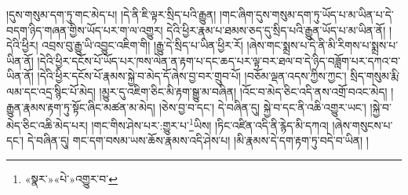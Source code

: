 །དུས་གསུམ་དག་ཏུ་གང་མེད་པ། །དེ་ནི་ཇི་ལྟར་སྲིད་པའི་རྒྱུན། །གང་ཞིག་དུས་གསུམ་དག་ཏུ་ཡོད་པ་མ་ཡིན་པ་དེ་བདག་ཉིད་གཞན་གྱིས་ཡོད་པར་ག་ལ་འགྱུར། དེའི་ཕྱིར་རྣམ་པ་ཐམས་ཅད་དུ་སྲིད་པའི་རྒྱུན་ཡོད་པ་མ་ཡིན་ནོ། །དེའི་ཕྱིར། འབྲས་བུ་རྒྱུ་ཡི་འབྱུང་འཇིག་གི། །རྒྱུ་དེ་སྲིད་པ་ཡིན་ཕྱིར་རོ། །ཞེས་གང་སྨྲས་པ་དེ་ནི་མི་རིགས་པ་སྨྲས་པ་ཡིན་ནོ། །དེའི་ཕྱིར་དངོས་པོ་ཡོད་པར་ཁས་ལེན་ན་རྟག་པ་དང་ཆད་པར་ལྟ་བར་ཐལ་བ་དེ་ཉིད་བཟློག་པར་དཀའ་བ་ཡིན་ནོ། །དེའི་ཕྱིར་དངོས་པོ་རྣམས་སྐྱེ་བ་མེད་དོ་ཞེས་བྱ་བར་གྲུབ་པོ། །བཅོམ་ལྡན་འདས་ཀྱིས་ཀྱང་། སྲིད་གསུམ་རྨི་ལམ་དང་འདྲ་སྙིང་པོ་མེད། །མྱུར་དུ་འཇིག་ཅིང་མི་རྟག་སྒྱུ་མ་བཞིན། །འོང་བ་མེད་ཅིང་འདི་ནས་འགྲོ་བའང་མེད། །རྒྱུན་རྣམས་རྟག་ཏུ་སྟོང་ཞིང་མཚན་མ་མེད། །ཅེས་བྱ་བ་དང་། དེ་བཞིན་དུ། སྐྱེ་བ་དང་ནི་འཆི་འགྱུར་ཡང་། །སྐྱེ་བ་མེད་ཅིང་འཆི་མེད་པར། །གང་གིས་ཤེས་པར་:གྱུར་པ་\footnote{«སྣར་»«པེ་»འགྱུར་བ་}ཡིས། །ཏིང་འཛིན་འདི་ནི་རྙེད་མི་དཀའ། །ཞེས་གསུངས་པ་དང་། དེ་བཞིན་དུ། གང་དག་བསམ་ཡས་ཆོས་རྣམས་འདི་ཤེས་པ། །མི་རྣམས་དེ་དག་རྟག་ཏུ་བདེ་བ་ཡིན། །
